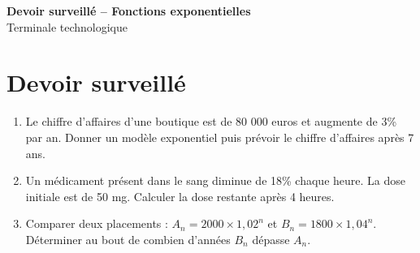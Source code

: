 \documentclass[french,11pt]{book}
\begin{document}
\begin{center}
{\Large \textbf{Devoir surveillé -- Fonctions exponentielles}}\\[2mm]
Terminale technologique
\end{center}

\section*{Devoir surveillé}
\begin{enumerate}
  \item Le chiffre d'affaires d'une boutique est de 80 000 euros et augmente de 3\% par an. Donner un modèle exponentiel puis prévoir le chiffre d'affaires après 7 ans.
  \item Un médicament présent dans le sang diminue de 18\% chaque heure. La dose initiale est de 50 mg. Calculer la dose restante après 4 heures.
  \item Comparer deux placements : $A_n=2000\times1,02^n$ et $B_n=1800\times1,04^n$. Déterminer au bout de combien d'années $B_n$ dépasse $A_n$.
\end{enumerate}
\end{document}
